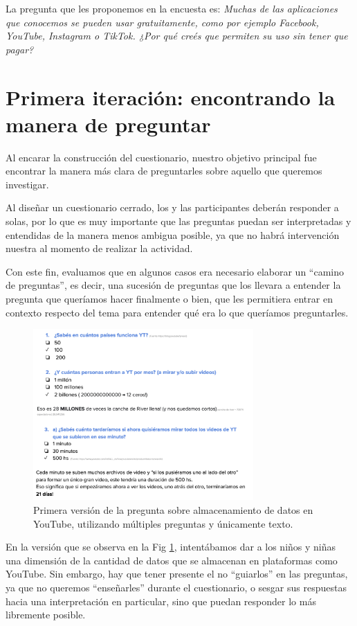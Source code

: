 La pregunta que les proponemos en la encuesta es: \textit{Muchas de las aplicaciones que conocemos se pueden usar gratuitamente, como por ejemplo Facebook, YouTube, Instagram o TikTok. ¿Por qué creés que permiten su uso sin tener que pagar?}

\section{Primera iteración: encontrando la manera de preguntar}

Al encarar la construcción del cuestionario, nuestro objetivo principal fue encontrar la manera más clara de preguntarles sobre aquello que queremos investigar.   

Al diseñar un cuestionario cerrado, los y las participantes deberán responder a solas, por lo que es muy importante que las preguntas puedan ser interpretadas y entendidas de la manera menos ambigua posible, ya que no habrá intervención nuestra al momento de realizar la actividad.

Con este fin, evaluamos que en algunos casos era necesario elaborar un “camino de preguntas”, es decir, una sucesión de preguntas que los llevara a entender la pregunta que queríamos hacer finalmente o bien, que les permitiera entrar en contexto respecto del tema para entender qué era lo que queríamos preguntarles.

\begin{figure}[h]
    \centering
    \includegraphics[width=0.75\textwidth]{images/2.png}
    \caption{Primera versión de la pregunta sobre almacenamiento de datos en YouTube, utilizando múltiples preguntas y únicamente texto.}
    \label{fig:cuest2}
\end{figure}

En la versión que se observa en la Fig \ref{fig:cuest2}, intentábamos dar a los niños y niñas una dimensión de la cantidad de datos que se almacenan en plataformas como YouTube. Sin embargo, hay que tener presente el no “guiarlos” en las preguntas, ya que no queremos “enseñarles” durante el cuestionario, o sesgar sus respuestas hacia una interpretación en particular, sino que puedan responder lo más libremente posible.

